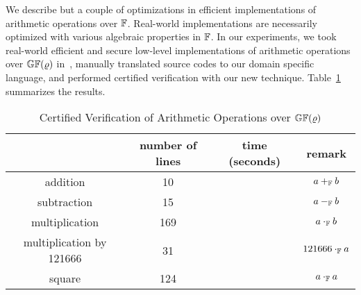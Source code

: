 We describe but a couple of optimizations in efficient implementations
of arithmetic operations over $\mathbb{F}$. Real-world implementations
are necessarily optimized with various algebraic properties in
$\mathbb{F}$. In our experiments, we took real-world efficient and secure
low-level implementations of arithmetic operations over
$\mathbb{GF}(\varrho)$ in~, manually translated source
codes to our domain specific language, and performed certified
verification with our new technique. 
Table~\ref{table:arithmetic-operations} summarizes the results.


\begin{table}[ht]
  \caption{Certified Verification of Arithmetic Operations over
    $\mathbb{GF}(\varrho)$}
  \centering
  \begin{tabular}{|c|c|c|c|}
    \hline
             & number of lines & time (seconds) & remark\\
    \hline
    addition & 10 &                       & $a +_{\mathbb{F}} b$ \\
    \hline
    subtraction & 15 &                    & $a -_{\mathbb{F}} b$ \\
    \hline
    multiplication & 169 &                & $a \cdot_{\mathbb{F}} b$\\
    \hline
    multiplication by 121666 & 31 &       & $121666 \cdot_{\mathbb{F}} a$\\
    \hline
    square & 124 &                        & $a \cdot_{\mathbb{F}} a$\\
    \hline
  \end{tabular}
  \label{table:arithmetic-operations}
\end{table}